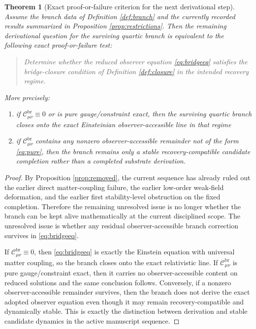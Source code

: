 \documentclass[11pt]{article}
\newtheorem{theorem}{Theorem}
\begin{document}
\begin{theorem}[Exact proof-or-failure criterion for the next derivational step]
\label{thm:criterion}
Assume the branch data of Definition \ref{def:branch} and the currently recorded results summarized in Proposition \ref{prop:restrictions}. Then the remaining derivational question for the surviving quartic branch is equivalent to the following exact proof-or-failure test:
\begin{quote}
Determine whether the reduced observer equation \eqref{eq:bridgeeq} satisfies the bridge-closure condition of Definition \ref{def:closure} in the intended recovery regime.
\end{quote}
More precisely:
\begin{enumerate}
    \item if \(\mathcal C_{\mu\nu}^{\mathrm{br}}\equiv 0\) or is pure gauge/constraint exact, then the surviving quartic branch closes onto the exact Einsteinian observer-accessible line in that regime
    \item if \(\mathcal C_{\mu\nu}^{\mathrm{br}}\) contains any nonzero observer-accessible remainder not of the form \eqref{eq:pure}, then the branch remains only a stable recovery-compatible candidate completion rather than a completed substrate derivation.
\end{enumerate}
\end{theorem}

\begin{proof}
By Proposition \ref{prop:removed}, the current sequence has already ruled out the earlier direct matter-coupling failure, the earlier low-order weak-field deformation, and the earlier first stability-level obstruction on the fixed completion. Therefore the remaining unresolved issue is no longer whether the branch can be kept alive mathematically at the current disciplined scope. The unresolved issue is whether any residual observer-accessible branch correction survives in \eqref{eq:bridgeeq}.

If \(\mathcal C_{\mu\nu}^{\mathrm{br}}\equiv 0\), then \eqref{eq:bridgeeq} is exactly the Einstein equation with universal matter coupling, so the branch closes onto the exact relativistic line. If \(\mathcal C_{\mu\nu}^{\mathrm{br}}\) is pure gauge/constraint exact, then it carries no observer-accessible content on reduced solutions and the same conclusion follows. Conversely, if a nonzero observer-accessible remainder survives, then the branch does not derive the exact adopted observer equation even though it may remain recovery-compatible and dynamically stable. This is exactly the distinction between derivation and stable candidate dynamics in the active manuscript sequence.
\end{proof}
\end{document}
